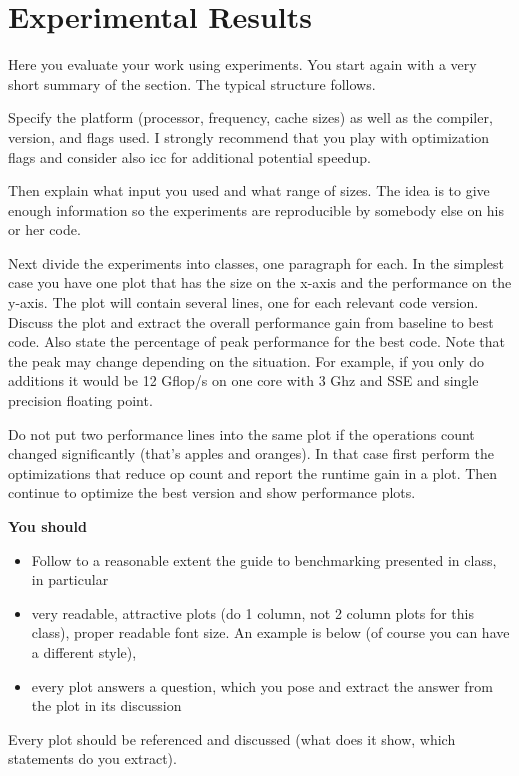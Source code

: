 \section{Experimental Results}\label{sec:exp}

Here you evaluate your work using experiments. You start again with a
very short summary of the section. The typical structure follows.

 Specify the platform (processor, frequency, cache sizes)
as well as the compiler, version, and flags used. I strongly recommend that you play with optimization flags and consider also icc for additional potential speedup.

Then explain what input you used and what range of sizes. The idea is to give enough information so the experiments are reproducible by somebody else on his or her code.

Next divide the experiments into classes, one paragraph for each. In the simplest case you have one plot that has the size on the x-axis and the performance on the y-axis. The plot will contain several lines, one for each relevant code version. Discuss the plot and extract the overall performance gain from baseline to best code. Also state the percentage of peak performance for the best code. Note that the peak may change depending on the situation. For example, if you only do additions it would be 12 Gflop/s
on one core with 3 Ghz and SSE and single precision floating point.

Do not put two performance lines into the same plot if the operations count changed significantly (that's apples and oranges). In that case first perform the optimizations that reduce op count and report the runtime gain in a plot. Then continue to optimize the best version and show performance plots.

{\bf You should}
\begin{itemize}
\item Follow to a reasonable extent the guide to benchmarking presented in class, in particular
\item very readable, attractive plots (do 1 column, not 2 column plots
for this class), proper readable font size. An example is below (of course you can have a different style),
\item every plot answers a question, which you pose and extract the
answer from the plot in its discussion
\end{itemize}
Every plot should be referenced and discussed (what does it show, which statements do
you extract).